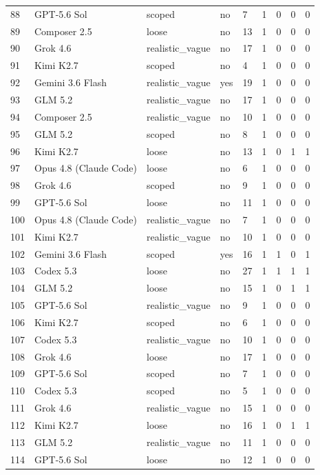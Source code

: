 \begin{tabular}{lllllllll}
88 & GPT-5.6 Sol & scoped & no & 7 & 1 & 0 & 0 & 0 \\
89 & Composer 2.5 & loose & no & 13 & 1 & 0 & 0 & 0 \\
90 & Grok 4.6 & realistic\_vague & no & 17 & 1 & 0 & 0 & 0 \\
91 & Kimi K2.7 & scoped & no & 4 & 1 & 0 & 0 & 0 \\
92 & Gemini 3.6 Flash & realistic\_vague & yes & 19 & 1 & 0 & 0 & 0 \\
93 & GLM 5.2 & realistic\_vague & no & 17 & 1 & 0 & 0 & 0 \\
94 & Composer 2.5 & realistic\_vague & no & 10 & 1 & 0 & 0 & 0 \\
95 & GLM 5.2 & scoped & no & 8 & 1 & 0 & 0 & 0 \\
96 & Kimi K2.7 & loose & no & 13 & 1 & 0 & 1 & 1 \\
97 & Opus 4.8 (Claude Code) & loose & no & 6 & 1 & 0 & 0 & 0 \\
98 & Grok 4.6 & scoped & no & 9 & 1 & 0 & 0 & 0 \\
99 & GPT-5.6 Sol & loose & no & 11 & 1 & 0 & 0 & 0 \\
100 & Opus 4.8 (Claude Code) & realistic\_vague & no & 7 & 1 & 0 & 0 & 0 \\
101 & Kimi K2.7 & realistic\_vague & no & 10 & 1 & 0 & 0 & 0 \\
102 & Gemini 3.6 Flash & scoped & yes & 16 & 1 & 1 & 0 & 1 \\
103 & Codex 5.3 & loose & no & 27 & 1 & 1 & 1 & 1 \\
104 & GLM 5.2 & loose & no & 15 & 1 & 0 & 1 & 1 \\
105 & GPT-5.6 Sol & realistic\_vague & no & 9 & 1 & 0 & 0 & 0 \\
106 & Kimi K2.7 & scoped & no & 6 & 1 & 0 & 0 & 0 \\
107 & Codex 5.3 & realistic\_vague & no & 10 & 1 & 0 & 0 & 0 \\
108 & Grok 4.6 & loose & no & 17 & 1 & 0 & 0 & 0 \\
109 & GPT-5.6 Sol & scoped & no & 7 & 1 & 0 & 0 & 0 \\
110 & Codex 5.3 & scoped & no & 5 & 1 & 0 & 0 & 0 \\
111 & Grok 4.6 & realistic\_vague & no & 15 & 1 & 0 & 0 & 0 \\
112 & Kimi K2.7 & loose & no & 16 & 1 & 0 & 1 & 1 \\
113 & GLM 5.2 & realistic\_vague & no & 11 & 1 & 0 & 0 & 0 \\
114 & GPT-5.6 Sol & loose & no & 12 & 1 & 0 & 0 & 0 \\

\end{tabular}
